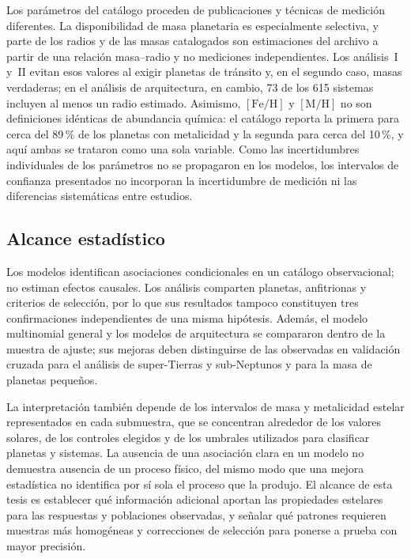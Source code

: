 Los parámetros del catálogo proceden de publicaciones y técnicas de medición diferentes. La disponibilidad de masa planetaria es especialmente selectiva, y parte de los radios y de las masas catalogados son estimaciones del archivo a partir de una relación masa--radio y no mediciones independientes. Los análisis~I y~II evitan esos valores al exigir planetas de tránsito y, en el segundo caso, masas verdaderas; en el análisis de arquitectura, en cambio, 73 de los 615 sistemas incluyen al menos un radio estimado. Asimismo, $[\mathrm{Fe/H}]$ y $[\mathrm{M/H}]$ no son definiciones idénticas de abundancia química: el catálogo reporta la primera para cerca del 89\,\% de los planetas con metalicidad y la segunda para cerca del 10\,\%, y aquí ambas se trataron como una sola variable. Como las incertidumbres individuales de los parámetros no se propagaron en los modelos, los intervalos de confianza presentados no incorporan la incertidumbre de medición ni las diferencias sistemáticas entre estudios.

\subsection{Alcance estadístico}
\label{sec:dis-alcance}

Los modelos identifican asociaciones condicionales en un catálogo observacional; no estiman efectos causales. Los análisis comparten planetas, anfitrionas y criterios de selección, por lo que sus resultados tampoco constituyen tres confirmaciones independientes de una misma hipótesis. Además, el modelo multinomial general y los modelos de arquitectura se compararon dentro de la muestra de ajuste; sus mejoras deben distinguirse de las observadas en validación cruzada para el análisis de super-Tierras y sub-Neptunos y para la masa de planetas pequeños.

La interpretación también depende de los intervalos de masa y metalicidad estelar representados en cada submuestra, que se concentran alrededor de los valores solares, de los controles elegidos y de los umbrales utilizados para clasificar planetas y sistemas. La ausencia de una asociación clara en un modelo no demuestra ausencia de un proceso físico, del mismo modo que una mejora estadística no identifica por sí sola el proceso que la produjo. El alcance de esta tesis es establecer qué información adicional aportan las propiedades estelares para las respuestas y poblaciones observadas, y señalar qué patrones requieren muestras más homogéneas y correcciones de selección para ponerse a prueba con mayor precisión.
